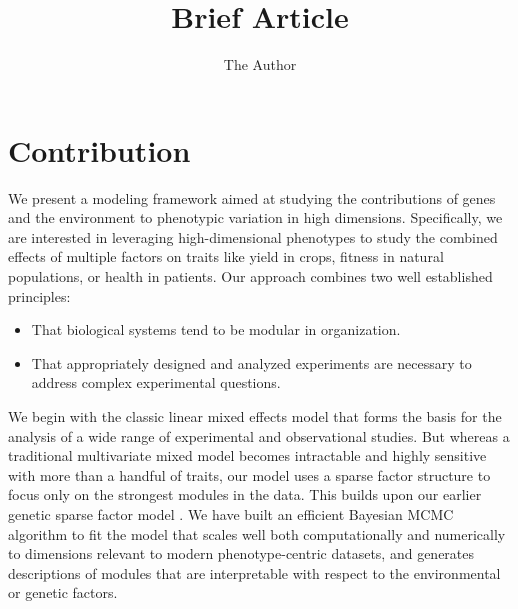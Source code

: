 \documentclass[11pt]{amsart}
\title{Brief Article}
\author{The Author}
\begin{document}

\section{Contribution}
	We present a modeling framework aimed at studying the contributions of genes and the environment to phenotypic variation in high dimensions. Specifically, we are interested in leveraging high-dimensional phenotypes to study the combined effects of multiple factors on traits like yield in crops, fitness in natural populations, or health in patients. Our approach combines two well established principles: 
	\begin{itemize}
	\item That biological systems tend to be modular in organization. 
	\item That appropriately designed and analyzed experiments are necessary to address complex experimental questions.
	\end{itemize}

We begin with the classic linear mixed effects model that forms the basis for the analysis of a wide range of experimental and observational studies.	But whereas a traditional multivariate mixed model becomes intractable and highly sensitive with more than a handful of traits, our model uses a sparse factor structure to focus only on the strongest modules in the data. This builds upon our earlier genetic sparse factor model \citep{Runcie:2013ky}. 
We have built an efficient Bayesian MCMC algorithm to fit the model that scales well both computationally and numerically to dimensions relevant to modern phenotype-centric datasets, and generates descriptions of modules that are interpretable with respect to the environmental or genetic factors. 
\end{document}
